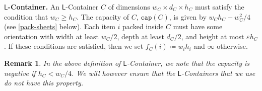 \documentclass[10pt,a4paper]{amsart}
\newcommand{\akr}[1]{}
\newcommand{\eps}{\varepsilon}
\newtheorem{remark}[theorem]{Remark}
\theoremstyle{definition}
\newcommand{\LContainer}{$\mathsf{L}$-Container}
\newcommand{\LContainers}{$\mathsf{L}$-Containers}
\begin{document}
\textbf{\LContainer.} An \LContainer{} $C$ of dimensions $w_C\times d_C\times h_C$ must satisfy the condition that $w_C\ge h_C$.
The capacity of $C$, $\mathtt{cap}(C)$, is given by $w_Ch_C-w_C^2/4$ (see \cref{pack-sheets} below).
Each item $i$ packed inside $C$ must have some orientation with width at least $w_C/2$, depth at least $d_C/2$, and height at most $\eps h_C$. 
If these conditions are satisfied, then we set $f_C(i)\coloneqq w_ih_i$ and $\infty$ otherwise.

\begin{remark}
    In the above definition of \LContainer, we note that the capacity is negative if $h_C<w_C/4$. We will however ensure that the \LContainers{} that we use do not have this property.
\end{remark}
\end{document}
